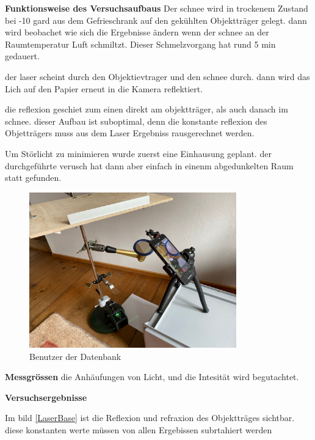 \textbf{Funktionsweise des Versuchsaufbaus}
Der schnee wird in trockenem Zustand bei -10 gard aus dem Gefrieschrank auf den gekühlten Objektträger gelegt. dann wird beobachet wie sich die Ergebnisse ändern wenn der schnee an der Raumtemperatur Luft schmiltzt. Dieser Schmelzvorgang hat rund 5 min gedauert.

der laser scheint durch den Objektievtrager und den schnee durch. dann wird das Lich auf den Papier erneut in die Kamera reflektiert.

die reflexion geschiet zum einen direkt am objektträger, als auch danach im schnee. dieser Aufbau ist suboptimal, denn die konstante reflexion des Objetträgers muss aus dem Laser Ergebniss rausgerechnet werden.

Um Störlicht zu minimieren wurde zuerst eine Einhausung geplant. der durchgeführte verusch hat dann aber einfach in einenm abgedunkelten Raum statt gefunden.

\begin{figure}
    \centering
    \includegraphics[width=0.8\textwidth]{Bilder/signal-2024-03-10-112013_006.jpeg}
    \caption{Benutzer der Datenbank}
    \label{fig:LaserAufbau}
\end{figure}



\textbf{Messgrössen}
die Anhäufungen von Licht, und die Intesität wird begutachtet.

\textbf{Versuchsergebnisse}

Im bild \ref{LaserBase} ist die Reflexion und refraxion des Objektträges sichtbar. diese konstanten werte müssen von allen Ergebissen subrtahiert werden

